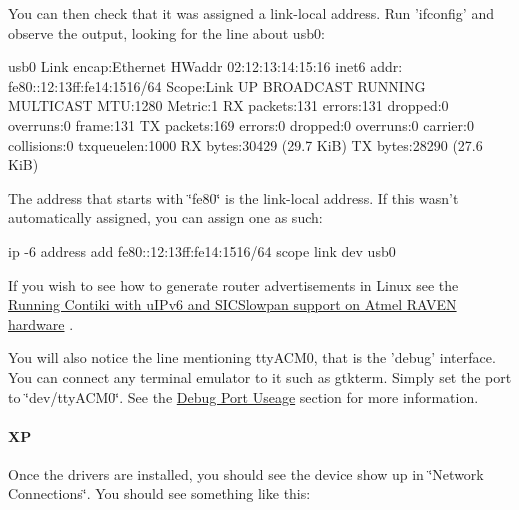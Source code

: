 

\-You can then check that it was assigned a link-\/local address. \-Run 'ifconfig' and observe the output, looking for the line about usb0\-:

\begin{DoxyVerb}
usb0      Link encap:Ethernet  HWaddr 02:12:13:14:15:16
          inet6 addr: fe80::12:13ff:fe14:1516/64 Scope:Link
          UP BROADCAST RUNNING MULTICAST  MTU:1280  Metric:1
          RX packets:131 errors:131 dropped:0 overruns:0 frame:131
          TX packets:169 errors:0 dropped:0 overruns:0 carrier:0
          collisions:0 txqueuelen:1000
          RX bytes:30429 (29.7 KiB)  TX bytes:28290 (27.6 KiB)
\end{DoxyVerb}


\-The address that starts with \char`\"{}fe80\char`\"{} is the link-\/local address. \-If this wasn't automatically assigned, you can assign one as such\-:

\begin{DoxyVerb}
ip -6 address add fe80::12:13ff:fe14:1516/64 scope link dev usb0
\end{DoxyVerb}


\-If you wish to see how to generate router advertisements in \-Linux see the \hyperlink{a00058}{\-Running \-Contiki with u\-I\-Pv6 and \-S\-I\-C\-Slowpan support on \-Atmel \-R\-A\-V\-E\-N hardware} .

\-You will also notice the line mentioning tty\-A\-C\-M0, that is the 'debug' interface. \-You can connect any terminal emulator to it such as gtkterm. \-Simply set the port to \char`\"{}dev/tty\-A\-C\-M0\char`\"{}. \-See the \hyperlink{a00053_DebugPort}{\-Debug \-Port \-Useage} section for more information.\hypertarget{a00053_Windows}{}\paragraph{\-X\-P}\label{a00053_Windows}
\-Once the drivers are installed, you should see the device show up in \char`\"{}\-Network Connections\char`\"{}. \-You should see something like this\-:



